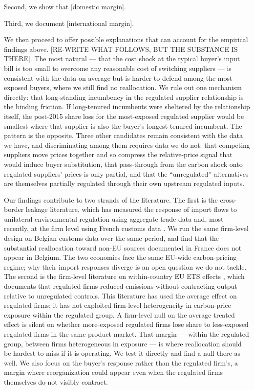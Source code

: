 Second, we show that [domestic margin].

Third, we document [international margin].

We then proceed to offer possible explanations that can account for the empirical findings above. [RE-WRITE WHAT FOLLOWS, BUT THE SUBSTANCE IS THERE]. The most natural --- that the cost shock at the typical buyer's input bill is too small to overcome any reasonable cost of switching suppliers --- is consistent with the data on average but is harder to defend among the most exposed buyers, where we still find no reallocation. We rule out one mechanism directly: that long-standing incumbency in the regulated supplier relationship is the binding friction. If long-tenured incumbents were sheltered by the relationship itself, the post-2015 share loss for the most-exposed regulated supplier would be smallest where that supplier is also the buyer's longest-tenured incumbent. The pattern is the opposite. Three other candidates remain consistent with the data we have, and discriminating among them requires data we do not: that competing suppliers move prices together and so compress the relative-price signal that would induce buyer substitution, that pass-through from the carbon shock onto regulated suppliers' prices is only partial, and that the ``unregulated'' alternatives are themselves partially regulated through their own upstream regulated inputs.

Our findings contribute to two strands of the literature. The first is the cross-border leakage literature, which has measured the response of import flows to unilateral environmental regulation using aggregate trade data \citep{aichelefelbermayr2015,naegelezaklan2019,satodechezlepretre2015} and, most recently, at the firm level using French customs data \citep{CosterMejeanDiGiovanni2024}. We run the same firm-level design on Belgian customs data over the same period, and find that the substantial reallocation toward non-EU sources documented in France does not appear in Belgium. The two economies face the same EU-wide carbon-pricing regime; why their import responses diverge is an open question we do not tackle. The second is the firm-level literature on within-country EU ETS effects \citep{martin2014,dechezlepretreetal2023,colmeretal2023,kanzig2023unequal}, which documents that regulated firms reduced emissions without contracting output relative to unregulated controls. This literature has used the average effect on regulated firms; it has not exploited firm-level heterogeneity in carbon-price exposure within the regulated group. A firm-level null on the average treated effect is silent on whether more-exposed regulated firms lose share to less-exposed regulated firms in the same product market. That margin --- within the regulated group, between firms heterogeneous in exposure --- is where reallocation should be hardest to miss if it is operating. We test it directly and find a null there as well. We also focus on the buyer's response rather than the regulated firm's, a margin where reorganization could appear even when the regulated firms themselves do not visibly contract.
